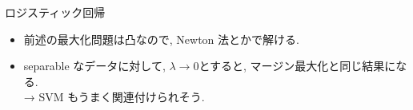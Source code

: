 \documentclass[dvipdfmx,8pt]{beamer}
\begin{document}
  \begin{frame}{ロジスティック回帰}
    \begin{itemize}
      \item 前述の最大化問題は凸なので, Newton 法とかで解ける.
      \item separable なデータに対して, $\lambda\to 0$とすると, マージン最大化と同じ結果になる. \\
        → SVM もうまく関連付けられそう. 
    \end{itemize}
  \end{frame}

\end{document}
